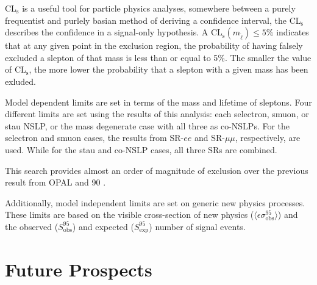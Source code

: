CL$_{\text{s}}$ is a useful tool for particle physics analyses, somewhere between a purely frequentist and purlely basian method of deriving a confidence interval, the CL$_{\text{s}}$ describes the confidence in a signal-only hypothesis. A CL$_{\text{s}}(m_{\tilde{\ell}}) \leq 5\%$ indicates that at any given point in the exclusion region, the probability of having falsely excluded a slepton of that mass is less than or equal to 5\%. The smaller the value of CL$_{\text{s}}$, the more lower the probability that a slepton with a given mass has been exluded.  

Model dependent limits are set in terms of the mass and lifetime of sleptons. Four different limits are set using the results of this analysis: each selectron, smuon, or stau \ac{NSLP}, or the mass degenerate case with all three as co-NSLPs. For the selectron and smuon cases, the results from SR-$ee$ and SR-$\mu\mu$, respectively, are used. While for the stau and co-NSLP cases, all three SRs are combined.


This search provides almost an order of magnitude of exclusion over the previous result from OPAL and 90 \GeV. 


Additionally, model independent limits are set on generic new physics processes. These limits are based on the visible cross-section of new physics ($\langle \epsilon \sigma^{95}_{\text{obs}} \rangle$) and the observed ($S^{95}_{\text{obs}}$) and expected ($S^{95}_{\text{exp}}$) number of signal events. 




\section{Future Prospects}
